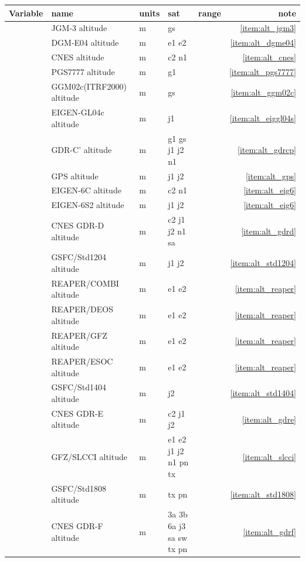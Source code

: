 \documentclass[a4paper,11pt,openany,natbib,nomargin]{thesis}
\newenvironment{vartable}{
\begin{table}[ht]
\small
\begin{tabular}{lllllr}
\hline\hline
Variable & name & units & sat & range & note \\
\hline\hline
}{
\hline
\end{tabular}
\end{table}
}
\begin{document}
\begin{vartable}
\var{alt_jgm3}     & JGM-3 altitude   & m & gs && \ref{item:alt_jgm3} \\
\var{alt_dgme04}   & DGM-E04 altitude & m & e1 e2 && \ref{item:alt_dgme04} \\
\var{alt_cnes}     & CNES altitude    & m & c2 n1 && \ref{item:alt_cnes} \\
\var{alt_pgs7777}  & PGS7777 altitude  & m & g1 && \ref{item:alt_pgs7777} \\
\var{alt_ggm02c_itrf2000} & GGM02c(ITRF2000) altitude  & m & gs && \ref{item:alt_ggm02c} \\
\var{alt_eiggl04s} & EIGEN-GL04c altitude & m & j1 && \ref{item:alt_eiggl04s} \\
\var{alt_gdrcp}    & GDR-C' altitude & m & g1 gs j1 j2 n1 && \ref{item:alt_gdrcp} \\
\var{alt_gps}      & GPS altitude & m & j1 j2 && \ref{item:alt_gps} \\
\var{alt_eig6c}    & EIGEN-6C altitude & m & c2 n1 && \ref{item:alt_eig6} \\
\var{alt_eig6s2}   & EIGEN-6S2 altitude & m & j1 j2 && \ref{item:alt_eig6} \\
\var{alt_gdrd}     & CNES GDR-D altitude & m & c2 j1 j2 n1 sa && \ref{item:alt_gdrd} \\
\var{alt_std1204}  & GSFC/Std1204 altitude & m & j1 j2 && \ref{item:alt_std1204} \\
\var{alt_reaper}   & REAPER/COMBI altitude & m & e1 e2 && \ref{item:alt_reaper} \\
\var{alt_reaper_deos} & REAPER/DEOS altitude & m & e1 e2 && \ref{item:alt_reaper} \\
\var{alt_reaper_gfz}  & REAPER/GFZ altitude & m & e1 e2 && \ref{item:alt_reaper} \\
\var{alt_reaper_esoc} & REAPER/ESOC altitude & m & e1 e2 && \ref{item:alt_reaper} \\
\var{alt_std1404}  & GSFC/Std1404 altitude & m & j2 && \ref{item:alt_std1404} \\
\var{alt_gdre}     & CNES GDR-E altitude & m & c2 j1 j2 && \ref{item:alt_gdre} \\
\var{alt_slcci}    & GFZ/SLCCI altitude & m & e1 e2 j1 j2 n1 pn tx && \ref{item:alt_slcci} \\
\var{alt_std1808}  & GSFC/Std1808 altitude & m & tx pn && \ref{item:alt_std1808} \\
\var{alt_gdrf}     & CNES GDR-F altitude & m & 3a 3b 6a j3 sa sw tx pn && \ref{item:alt_gdrf} \\

\end{vartable}
\end{document}
